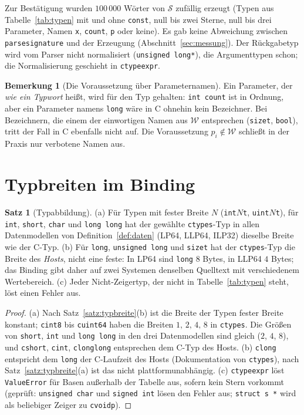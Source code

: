 \documentclass[a4paper,12pt,twoside]{report}
\DeclareRobustCommand{\_}{\ifmmode\mbox{\textunderscore}\else\textunderscore\allowbreak{}\fi}
\theoremstyle{definition}
\newtheorem{satz}{Satz}[chapter]
\newtheorem{bemerkung}{Bemerkung}[chapter]
\begin{document}
Zur Bestätigung wurden $100\,000$ Wörter von $\mathcal S$ zufällig erzeugt (Typen aus Tabelle~\ref{tab:typen} mit und ohne \texttt{const}, null bis zwei Sterne, null bis drei Parameter, Namen \texttt{x}, \texttt{count}, \texttt{p\_1} oder keine). Es gab keine Abweichung zwischen \texttt{parse\_signature} und der Erzeugung (Abschnitt~\ref{sec:messung}). Der Rückgabetyp wird vom Parser nicht normalisiert (\texttt{unsigned long*}), die Argumenttypen schon; die Normalisierung geschieht in \texttt{ctype\_expr}.

\begin{bemerkung}[Die Voraussetzung über Parameternamen]
	Ein Parameter, der \emph{wie ein Typwort} heißt, wird für den Typ gehalten: \texttt{int count} ist in Ordnung, aber ein Parameter namens \texttt{long} wäre in C ohnehin kein Bezeichner. Bei Bezeichnern, die einem der einwortigen Namen aus $\mathcal W$ entsprechen (\texttt{size\_t}, \texttt{bool}), tritt der Fall in C ebenfalls nicht auf. Die Voraussetzung $p_i\notin\mathcal W$ schließt in der Praxis nur verbotene Namen aus.
\end{bemerkung}

\section{Typbreiten im Binding}

\begin{satz}[Typabbildung]
	\label{satz:typabbildung}
	(a) Für Typen mit fester Breite $N$ (\texttt{int$N$\_t}, \texttt{uint$N$\_t}), für \texttt{int}, \texttt{short}, \texttt{char} und \texttt{long long} hat der gewählte \texttt{ctypes}-Typ in allen Datenmodellen von Definition~\ref{def:daten} (LP64, LLP64, ILP32) dieselbe Breite wie der C-Typ. (b) Für \texttt{long}, \texttt{unsigned long} und \texttt{size\_t} hat der \texttt{ctypes}-Typ die Breite des \emph{Hosts}, nicht eine feste: In LP64 sind \texttt{long} $8$ Bytes, in LLP64 $4$ Bytes; das Binding gibt daher auf zwei Systemen denselben Quelltext mit verschiedenem Wertebereich. (c) Jeder Nicht-Zeigertyp, der nicht in Tabelle~\ref{tab:typen} steht, löst einen Fehler aus.
\end{satz}

\begin{proof}
	(a) Nach Satz~\ref{satz:typbreite}(b) ist die Breite der Typen fester Breite konstant; \texttt{c\_int8} bis \texttt{c\_uint64} haben die Breiten $1,\,2,\,4,\,8$ in \texttt{ctypes}. Die Größen von \texttt{short}, \texttt{int} und \texttt{long long} in den drei Datenmodellen sind gleich ($2$, $4$, $8$), und \texttt{c\_short}, \texttt{c\_int}, \texttt{c\_longlong} entsprechen dem C-Typ des Hosts. (b) \texttt{c\_long} entspricht dem \texttt{long} der C-Laufzeit des Hosts (Dokumentation von \texttt{ctypes}), nach Satz~\ref{satz:typbreite}(a) ist das nicht plattformunabhängig. (c) \texttt{ctype\_expr} löst \texttt{ValueError} für Basen außerhalb der Tabelle aus, sofern kein Stern vorkommt (geprüft: \texttt{unsigned char} und \texttt{signed int} lösen den Fehler aus; \texttt{struct s *} wird als beliebiger Zeiger zu \texttt{c\_void\_p}).
\end{proof}
\end{document}
